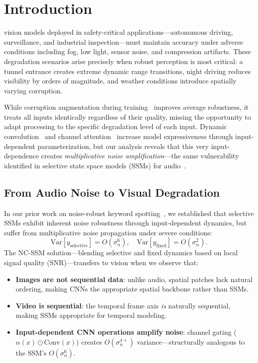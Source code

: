 \documentclass[journal]{IEEEtran}
\begin{document}
\section{Introduction}
\label{sec:intro}

 vision models deployed in safety-critical applications---autonomous driving, surveillance, and industrial inspection---must maintain accuracy under adverse conditions including fog, low light, sensor noise, and compression artifacts.
These degradation scenarios arise precisely when robust perception is most critical: a tunnel entrance creates extreme dynamic range transitions, night driving reduces visibility by orders of magnitude, and weather conditions introduce spatially varying corruption.

While corruption augmentation during training~\cite{hendrycks2020augmix,hendrycks2021deepaugment} improves average robustness, it treats all inputs identically regardless of their quality, missing the opportunity to adapt processing to the specific degradation level of each input.
Dynamic convolution~\cite{chen2020dynamic} and channel attention~\cite{hu2018squeeze} increase model expressiveness through input-dependent parameterization, but our analysis reveals that this very input-dependence creates \emph{multiplicative noise amplification}---the same vulnerability identified in selective state space models (SSMs) for audio~\cite{choi2026ncssm}.

\subsection{From Audio Noise to Visual Degradation}

In our prior work on noise-robust keyword spotting~\cite{choi2026ncssm}, we established that selective SSMs exhibit inherent noise robustness through input-dependent dynamics, but suffer from multiplicative noise propagation under severe conditions:
\begin{equation}
\text{Var}[y_{\text{selective}}] = O(\sigma_n^6), \quad
\text{Var}[y_{\text{fixed}}] = O(\sigma_n^2).
\label{eq:audio_var}
\end{equation}
The NC-SSM solution---blending selective and fixed dynamics based on local signal quality (SNR)---transfers to vision when we observe that:
\begin{itemize}
\setlength\itemsep{0pt}
\item \textbf{Images are not sequential data}: unlike audio, spatial patches lack natural ordering, making CNNs the appropriate spatial backbone rather than SSMs.
\item \textbf{Video is sequential}: the temporal frame axis \emph{is} naturally sequential, making SSMs appropriate for temporal modeling.
\item \textbf{Input-dependent CNN operations amplify noise}: channel gating ($\alpha(x) \odot \text{Conv}(x)$) creates $O(\sigma_n^{4+})$ variance---structurally analogous to the SSM's $O(\sigma_n^6)$.
\end{itemize}
\end{document}
